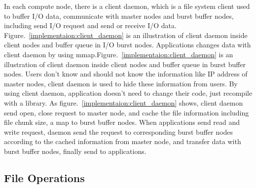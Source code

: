 In each compute node, there is a client daemon, which is a file system client used to buffer I/O
data, communicate with master nodes and burst buffer nodes, including send I/O request and send or
receive I/O data.
Figure.~\ref{implementaion:client_daemon} is an illustration of client daemon inside client nodes
and buffer queue in I/O burst nodes.
Applications changes data with client daemon by using mmap.Figure.~\ref{implementaion:client_daemon}
is an illustration of client daemon inside client nodes and buffer queue in burst buffer nodes.
Users don't know and should not know the information like IP address of master nodes,  client daemon
is used to hide these information from users.
By using client daemon, application doesn't need to change their code, just recompile with a
library.
As figure.~\ref{implementaion:client_daemon} shows, client daemon send open, close request to master
node, and cache the file information including file chunk size, a map to burst buffer nodes.
When applications send read and write request, daemon send the request to corresponding burst buffer nodes
according to the cached information from master node, and transfer data with burst buffer nodes, finally
send to applications.



\subsection{File Operations}

